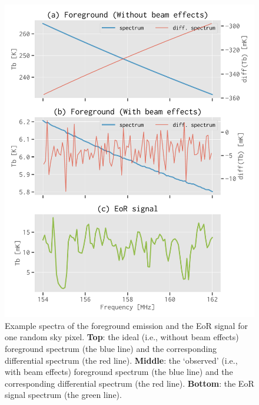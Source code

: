 \documentclass[fleqn,usenatbib]{mnras}
\newcommand{\edittwo}[1]{{\leavevmode\color{magenta}#1}}
\begin{document}
\begin{figure}
  \centering
  \includegraphics[width=\columnwidth]{simudata}
  \caption{\label{fig:simudata}\edittwo{%
    Example spectra of the foreground emission and the EoR signal for one
    random sky pixel.
    \textbf{Top}: the ideal (i.e., without beam effects) foreground
    spectrum (the blue line) and the corresponding differential spectrum
    (the red line).
    \textbf{Middle}: the `observed' (i.e., with beam effects) foreground
    spectrum (the blue line) and the corresponding differential spectrum
    (the red line).
    \textbf{Bottom}: the EoR signal spectrum (the green line).
  }}
\end{figure}
\end{document}
